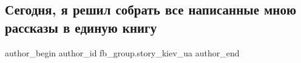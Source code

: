  
 
 
 
 

\subsection{Сегодня, я решил собрать все написанные мною рассказы  в единую книгу}
\label{sec:26_02_2023.fb.fb_group.story_kiev_ua.1.segodnya__ya_reshil_}

\ifcmt
 author_begin
   author_id fb_group.story_kiev_ua
 author_end
\fi
